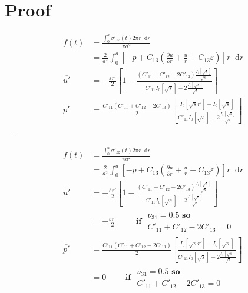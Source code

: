 \documentclass{article}
\renewcommand*{\d}{\mathop{}\!\mathrm{d}}
\newcommand{\Io}[1]{I_0\!\left[ #1 \right]}
\newcommand{\Ii}[1]{I_1\!\left[ #1 \right]}
\begin{document}
\section{Proof}
  \begin{align}
    f(t)&=\frac{\int_0^a \sigma'_{zz}(t) 2 \pi r \d r }{\pi a^2}    \\
    &=\frac{2}{a^2} \int_0^a \left[ -p + C_{13} \left(\frac{\partial u}{\partial r} + \frac{u}{r} + C_{13}\varepsilon \right) \right] r \d r  \tag{8}   \\
    \overbar{u'} &= - \frac{\overbar{\varepsilon}r'}{2} \left[ 1-\frac{\left(C'_{11}+C'_{12}-2C'_{13}\right) \frac{\Ii{\sqrt{s}}}{\sqrt{s}} }{C'_{11}\Io{\sqrt{s}} - 2 \frac{\Ii{\sqrt{s}}}{\sqrt{s}}} \right]   \tag{10}  \\
    \overbar{p'}&=\frac{C'_{11}\left(C'_{11}+C'_{12}-2C'_{13}\right)}{2} \left[ \frac{\Io{\sqrt{s}r'} - \Io{\sqrt{s}}}{C'_{11}\Io{\sqrt{s}} - 2 \frac{\Ii{\sqrt{s}}}{\sqrt{s}}} \right]  \tag{11}
  \end{align}
 ----

  \begin{align}
    f(t)&=\frac{\int_0^a \sigma'_{zz}(t) 2 \pi r \d r }{\pi a^2}    \\
    &=\frac{2}{a^2} \int_0^a \left[ -p + C_{13} \left(\frac{\partial u}{\partial r} + \frac{u}{r} + C_{13}\varepsilon \right) \right] r \d r  \tag{8}   \\
    \overbar{u'} &= - \frac{\overbar{\varepsilon}r'}{2} \left[ 1-\frac{\left(C'_{11}+C'_{12}-2C'_{13}\right) \frac{\Ii{\sqrt{s}}}{\sqrt{s}} }{C'_{11}\Io{\sqrt{s}} - 2 \frac{\Ii{\sqrt{s}}}{\sqrt{s}}} \right]   \tag{Cohen Eqn10}  \\
    &= -\frac{\varepsilon r'}{2} \qquad \textbf{ if } \substack{ \nu_{31}=0.5 \textbf{ so } \\ C'_{11}+C'_{12}-2C'_{13}=0 }  \\
    \overbar{p'}&=\frac{C'_{11}\left(C'_{11}+C'_{12}-2C'_{13}\right)}{2} \left[ \frac{\Io{\sqrt{s}r'} - \Io{\sqrt{s}}}{C'_{11}\Io{\sqrt{s}} - 2 \frac{\Ii{\sqrt{s}}}{\sqrt{s}}} \right]  \tag{11}   \\
    &= 0  \qquad \textbf{ if } \substack{ \nu_{31}=0.5 \textbf{ so } \\ C'_{11}+C'_{12}-2C'_{13}=0 }
  \end{align}
\end{document}
